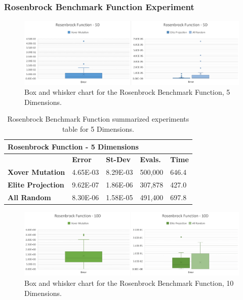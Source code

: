 \documentclass[graybox]{svmult}
\begin{document}
        \subsubsection{Rosenbrock Benchmark Function Experiment}

            \begin{figure}
                \includegraphics[width=\linewidth, frame]{img/fig_fun_rosenbrock_5d.pdf}
                \caption{Box and whisker chart for the Rosenbrock Benchmark Function, 5 Dimensions.} \label{fig.fun_rosenbrock_5d}
                \end{figure}

            \begin{table}[]
                \scriptsize
                \centering
                \caption{Rosenbrock Benchmark Function summarized experiments table for 5 Dimensions.}\label{tab.fun_rosenbrock5}
                \begin{tabular}{@{}lllll@{}}
                \toprule
                \multicolumn{5}{l}{\textbf{Rosenbrock Function - 5 Dimensions}} \\ \midrule
                & \textbf{Error} & \textbf{St-Dev} & \textbf{Evals.} & \textbf{Time} \\
                \textbf{Xover Mutation} & 4.65E-03 & 8.29E-03 & 500,000 & 646.4 \\
                \textbf{Elite Projection} & 9.62E-07 & 1.86E-06 & 307,878 & 427.0 \\
                \textbf{All Random} & 8.30E-06 & 1.58E-05 & 491,400 & 697.8 \\ \bottomrule
                \end{tabular}
                \end{table}


            \begin{figure}
                \includegraphics[width=\linewidth, frame]{img/fig_fun_rosenbrock_10d.pdf}
                \caption{Box and whisker chart for the Rosenbrock Benchmark Function, 10 Dimensions.} \label{fig.fun_rosenbrock_10d}
                \end{figure}
\end{document}
